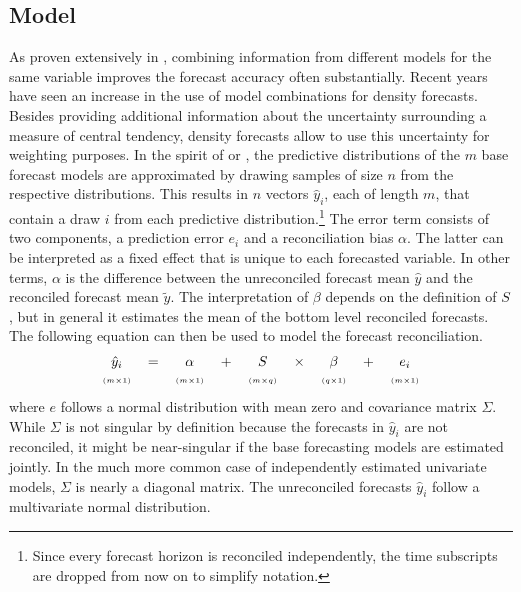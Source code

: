 \documentclass[a4paper,fleqn,11pt]{article}
\begin{document}
\subsection{Model}
As proven extensively in \cite{Timmermann2006}, combining information from different models for the same variable improves the forecast accuracy often substantially. Recent years have seen an increase in the use of model combinations for density forecasts. Besides providing additional information about the uncertainty surrounding a measure of central tendency, density forecasts allow to use this uncertainty for weighting purposes. In the spirit of \cite{Kapetanios2015} or \cite{Cesur2016}, the predictive distributions of the $m$ base forecast models are approximated by drawing samples of size $n$ from the respective distributions. This results in $n$ vectors $\hat{y}_{i}$, each of length $m$, that contain a draw $i$ from each predictive distribution.\footnote{Since every forecast horizon is reconciled independently, the time subscripts are dropped from now on to simplify notation.} The error term consists of two components, a prediction error $e_{i}$ and a reconciliation bias $\alpha$. The latter can be interpreted as a fixed effect that is unique to each forecasted variable. In other terms, $\alpha$ is the difference between the unreconciled forecast mean $\hat{y}$ and the reconciled forecast mean $\tilde{y}$. The interpretation of $\beta$ depends on the definition of $S$, but in general it estimates the mean of the bottom level reconciled forecasts. The following equation can then be used to model the forecast reconciliation.
\begin{align}
\label{eq:main}
\begin{tabular}{ccccccccc}
	$\hat{y}_i$ & $=$ & $\alpha$ & + &$S$ & $\times$ & $\beta$ & $+$ & $e_i$ \\
	$\scriptscriptstyle (m\times 1)$ & & $\scriptscriptstyle (m\times 1)$  & & $ \scriptscriptstyle (m\times q) $ & & $\scriptscriptstyle (q\times 1)$ & & $\scriptscriptstyle (m\times 1)$
\end{tabular}
\end{align}
where $e$ follows a normal distribution with mean zero and covariance matrix $\Sigma$. While $\Sigma$ is not singular by definition because the forecasts in $\hat{y}_{i}$ are not reconciled, it might be near-singular if the base forecasting models are estimated jointly. In the much more common case of independently estimated univariate models, $\Sigma$ is nearly a diagonal matrix. The unreconciled forecasts $\hat{y}_{i}$ follow a multivariate normal distribution.
\end{document}
